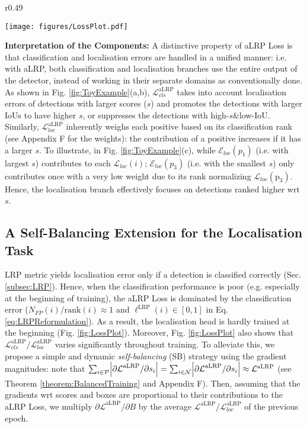 \documentclass{article}
\begin{document}
\begin{wrapfigure}{r}{0.49\textwidth}
  \begin{center}
    \texttt{[image: figures/LossPlot.pdf]}
  \end{center}
    \caption{aLRP Loss and its components. The localisation component is self-balanced.\label{fig:LossPlot}}
\end{wrapfigure}


\textbf{Interpretation of the Components:} A distinctive property of aLRP Loss is that classification  and  localisation errors are handled in a unified manner: i.e. with aLRP, both  classification and localisation branches use the entire output of the detector, instead of working in their separate domains as conventionally done. As shown in Fig. \ref{fig:ToyExample}(a,b),  $\mathcal{L}^\mathrm{aLRP}_{cls}$ takes into account localisation errors of detections with larger scores ($s$) and promotes the detections with larger IoUs to have higher $s$, or suppresses the detections with high-$s$\&low-IoU.  Similarly, $\mathcal{L}^\mathrm{aLRP}_{loc}$ inherently weighs each positive based on its classification rank (see Appendix F for the weights): the contribution of a positive increases if it has a larger $s$. To illustrate, in Fig. \ref{fig:ToyExample}(c), while $\mathcal{E}_{loc}(p_1)$ (i.e. with largest $s$) contributes to each $\mathcal{L}_{loc}(i)$; $\mathcal{E}_{loc}(p_3)$ (i.e. with the smallest $s$) only contributes once with a very low weight due to its rank normalizing $\mathcal{L}_{loc}(\mathrm{p}_3)$. Hence,  the localisation branch effectively focuses on detections ranked higher wrt $s$.  


\subsection{A Self-Balancing Extension for the Localisation Task}\label{sect:self_balance}
LRP metric yields localisation error only if a detection is classified correctly (Sec. \ref{subsec:LRP}). Hence,  when the classification performance is poor (e.g. especially at the beginning of training), the aLRP Loss is dominated by the classification error ($N_{FP}(i)/\mathrm{rank}(i) \approx 1$ and $\ell ^{\mathrm{LRP}} (i) \in [0,1]$ in Eq. \eqref{eq:LRPReformulation}). As a result,  the localisation head is hardly trained at the beginning (Fig. \ref{fig:LossPlot}). Moreover, Fig. \ref{fig:LossPlot} also shows that $\mathcal{L}^{\mathrm{aLRP}}_{cls}/\mathcal{L}^{\mathrm{aLRP}}_{loc}$ varies significantly throughout training. To alleviate this, we propose a simple and dynamic \textit{self-balancing} (SB) strategy using the gradient magnitudes: note that $ \sum_{i \in \mathcal{P}} \abs{{\partial \mathcal{L}}^{\mathrm{aLRP}}/{\partial s_i}} = \sum_{i \in \mathcal{N}} \abs{{\partial \mathcal{L}}^{\mathrm{aLRP}}/{\partial s_i}} \approx \mathcal{L}^{\mathrm{aLRP}}$ (see Theorem \ref{theorem:BalancedTraining} and Appendix F). Then, assuming that the gradients wrt scores and boxes are proportional to  their contributions to the aLRP Loss, we multiply ${\partial \mathcal{L}}^{\mathrm{aLRP}}/{\partial B}$ by the average $\mathcal{L}^{\mathrm{aLRP}}/\mathcal{L}^{\mathrm{aLRP}}_{loc}$ of the previous epoch. 
\end{document}

